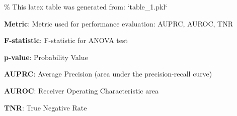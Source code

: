 \documentclass[11pt]{article}
\begin{document}
\begin{codeoutput}
\% This latex table was generated from: `table\_1.pkl`
\begin{table}[h]
\caption{Comparisons of doublet detection algorithms performance}
\label{table:algorithm\_comparisons}
\begin{threeparttable}
\renewcommand{\TPTminimum}{\linewidth}
\begin{tablenotes}
\footnotesize
\item \textbf{Metric}: Metric used for performance evaluation: AUPRC, AUROC, TNR
\item \textbf{F-statistic}: F-statistic for ANOVA test
\item \textbf{p-value}: Probability Value
\item \textbf{AUPRC}: Average Precision (area under the precision-recall curve)
\item \textbf{AUROC}: Receiver Operating Characteristic area
\item \textbf{TNR}: True Negative Rate
\end{tablenotes}
\end{threeparttable}
\end{table}
\end{codeoutput}
\end{document}
